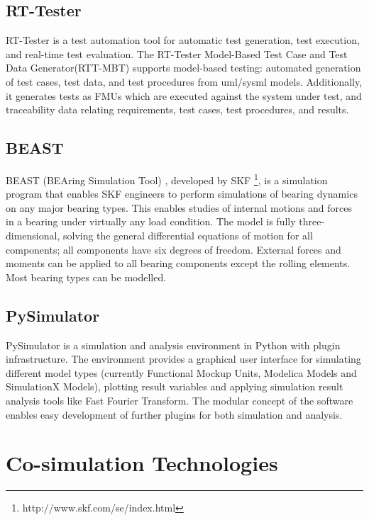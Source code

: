 \subsection{RT-Tester}
\label{sec:rttester}

RT-Tester \cite{rttester,rttester11} is a test automation tool for automatic test generation, test execution, and real-time test evaluation. The RT-Tester Model-Based Test Case and Test Data Generator(RTT-MBT) \cite{rttester,rttester13} supports model-based testing: automated generation of test cases, test data, and test procedures from \acrshort{uml}/\acrshort{sysml} models. Additionally, it generates tests as FMUs which are executed against the system under test, and traceability data relating requirements, test cases, test procedures, and results.

\subsection{BEAST}
\label{sec:beast}

BEAST (BEAring Simulation Tool) \cite{beast}, developed by SKF \footnote{http://www.skf.com/se/index.html}, is a simulation program that enables SKF engineers to perform simulations of bearing dynamics on any major bearing types. This enables studies of internal motions and forces in a bearing under virtually any load condition. The model is fully three-dimensional, solving the general differential equations of motion for all components; all components have six degrees of freedom. External forces and moments can be applied to all bearing components except the rolling elements. Most bearing types can be modelled.

\subsection{PySimulator}
\label{sec:pysimulator}

PySimulator \cite{pysimulator} is a simulation and analysis environment in Python with plugin infrastructure. The environment provides a graphical user interface for simulating different model types (currently Functional Mockup Units, Modelica Models and SimulationX Models), plotting result variables and applying simulation result analysis tools like Fast Fourier Transform. The modular concept of the software enables easy development of further plugins for both simulation and analysis. 

\section{Co-simulation Technologies}
\label{sec:cosimulaiton}



